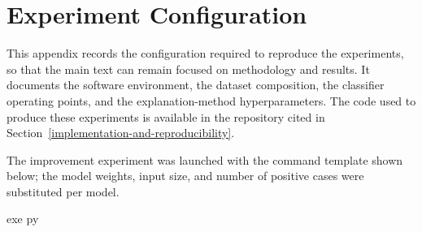 \appendix

\hypertarget{experiment-configuration}{%
	\chapter{Experiment Configuration}\label{experiment-configuration}}

This appendix records the configuration required to reproduce the
experiments, so that the main text can remain focused on methodology and
results. It documents the software environment, the dataset composition,
the classifier operating points, and the explanation-method
hyperparameters. The code used to produce these experiments is available
in the repository cited in
Section~\ref{implementation-and-reproducibility}.

The improvement experiment was launched with the command template shown
below; the model weights, input size, and number of positive cases were
substituted per model.

\begingroup
\renewcommand{\FunctionTok}[1]{#1}%
\begin{Shaded}
	\begin{Highlighting}[fontsize=\footnotesize,fontfamily=courier]
		\FunctionTok{exe}\NormalTok{ \textasciigrave{}} 
		\FunctionTok{py}\NormalTok{ \textasciigrave{}}
	\end{Highlighting}
\end{Shaded}
\endgroup

